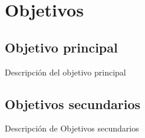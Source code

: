 \documentclass[../main.tex]{subfiles}
\begin{document}
\chapter{Objetivos}\label{ch:objetivos}
\section{Objetivo principal}\label{sec:obj_principal}
Descripción del objetivo principal

\section{Objetivos secundarios}\label{sec:obj_secundarios}
Descripción de Objetivos secundarios
\end{document}
